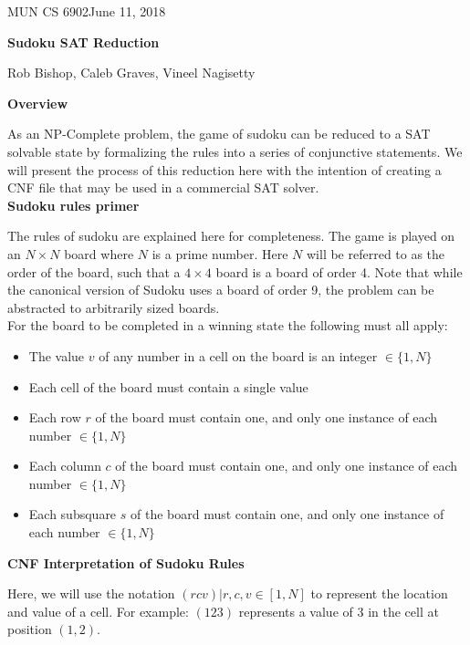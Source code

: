 \documentclass[11pt]{article}
\def\CourseCode{6902}			%
\def\DateHandedOut{June 11, 2018}	%
\begin{document}
\noindent
MUN CS \CourseCode \hfill \DateHandedOut\\
\begin{center}
\textbf{Sudoku SAT Reduction}

\medskip
Rob Bishop, Caleb Graves, Vineel Nagisetty
\end{center}

\textbf{Overview}

As an NP-Complete problem, the game of sudoku can be reduced to a SAT solvable state by formalizing the rules into a series of conjunctive statements. We will present the process of this reduction here with the intention of creating a CNF file that may be used in a commercial SAT solver.\\

\textbf{Sudoku rules primer}

The rules of sudoku are explained here for completeness. The game is played on an $N\times N$ board where $N$ is a prime number. Here $N$ will be referred to as the order of the board, such that a $4 \times 4$ board is a board of order 4. Note that while the canonical version of Sudoku uses a board of order 9, the problem can be abstracted to arbitrarily sized boards.\\

For the board to be completed in a winning state the following must all apply:
\begin{itemize}
\item The value $v$ of any number in a cell on the board is an integer $\in \{1, N\}$

\item Each cell of the board must contain a single value

\item Each row $r$ of the board must contain one, and only one instance of each number $\in \{1, N\}$

\item Each column $c$ of the board must contain one, and only one instance of each number $\in \{1, N\}$

\item Each subsquare $s$ of the board must contain one, and only one instance of each number $\in \{1, N\}$

\end{itemize}

\textbf{CNF Interpretation of Sudoku Rules}

Here, we will use the notation $(rcv) | r,c,v \in [1, N]$ to represent the location and value of a cell. For example: $(123)$ represents a value of 3 in the cell at position $(1,2)$.
\end{document}
